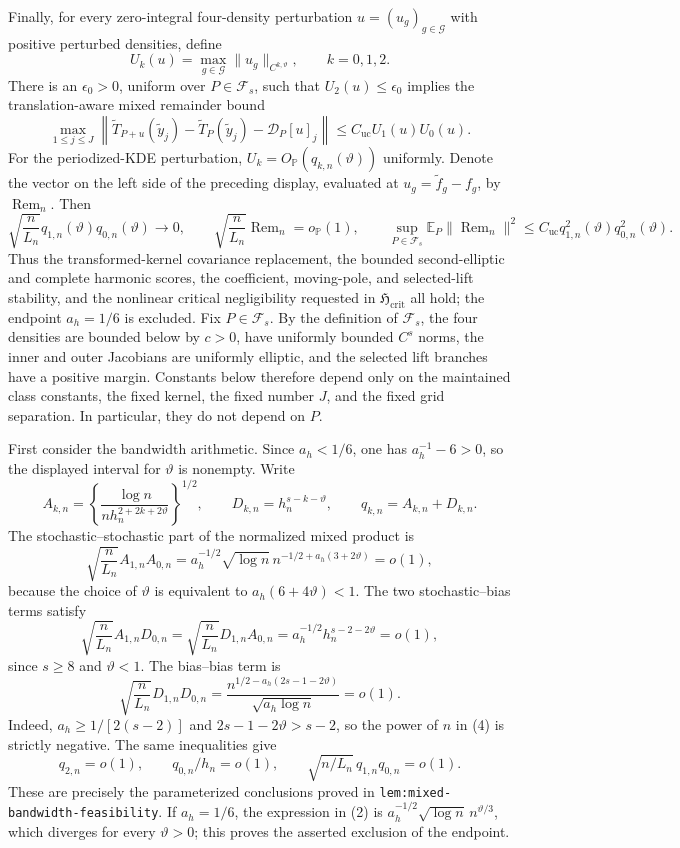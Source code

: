 Finally, for every zero-integral four-density perturbation \(u=(u_g)_{g\in\mathcal G}\) with positive perturbed densities, define
\[
 U_k(u)=\max_{g\in\mathcal G}\lVert u_g\rVert_{C^{k,\vartheta}},
 \qquad k=0,1,2.
\]
There is an \(\epsilon_0>0\), uniform over \(P\in\mathcal F_s\), such that \(U_2(u)\leq\epsilon_0\) implies the translation-aware mixed remainder bound
\[
 \max_{1\leq j\leq J}
 \left\lVert
 \widetilde T_{P+u}(\widetilde y_j)-\widetilde T_P(\widetilde y_j)
 -\mathcal D_P[u]_j
 \right\rVert
 \leq C_{\mathrm{uc}} U_1(u)U_0(u).
\]
For the periodized-KDE perturbation, \(U_k=O_{\mathbb P}(q_{k,n}(\vartheta))\) uniformly.  Denote the vector on the left side of the preceding display, evaluated at \(u_g=\widetilde f_g-f_g\), by \(\operatorname{Rem}_n\).  Then
\[
 \sqrt{\frac n{L_n}}q_{1,n}(\vartheta)q_{0,n}(\vartheta)\to0,
 \qquad
 \sqrt{\frac n{L_n}}\operatorname{Rem}_n=o_{\mathbb P}(1),
 \qquad
 \sup_{P\in\mathcal F_s}\mathbb E_P
 \lVert\operatorname{Rem}_n\rVert^2
 \leq C_{\mathrm{uc}}q_{1,n}^2(\vartheta)q_{0,n}^2(\vartheta).
\]
Thus the transformed-kernel covariance replacement, the bounded second-elliptic and complete harmonic scores, the coefficient, moving-pole, and selected-lift stability, and the nonlinear critical negligibility requested in \(\mathfrak H_{\mathrm{crit}}\) all hold; the endpoint \(a_h=1/6\) is excluded.
Fix \(P\in\mathcal F_s\).  By the definition of \(\mathcal F_s\), the four densities are bounded below by \(c>0\), have uniformly bounded \(C^s\) norms, the inner and outer Jacobians are uniformly elliptic, and the selected lift branches have a positive margin.  Constants below therefore depend only on the maintained class constants, the fixed kernel, the fixed number \(J\), and the fixed grid separation.  In particular, they do not depend on \(P\).

First consider the bandwidth arithmetic.  Since \(a_h<1/6\), one has \(a_h^{-1}-6>0\), so the displayed interval for \(\vartheta\) is nonempty.  Write
\[
 A_{k,n}=\left\{\frac{\log n}
 {n h_n^{2+2k+2\vartheta}}\right\}^{1/2},
 \qquad
 D_{k,n}=h_n^{s-k-\vartheta},
 \qquad q_{k,n}=A_{k,n}+D_{k,n}.
\tag{1}
\]
The stochastic--stochastic part of the normalized mixed product is
\[
 \sqrt{\frac n{L_n}}A_{1,n}A_{0,n}
 =a_h^{-1/2}\sqrt{\log n}\,
 n^{-1/2+a_h(3+2\vartheta)}=o(1),
\tag{2}
\]
because the choice of \(\vartheta\) is equivalent to
\(a_h(6+4\vartheta)<1\).  The two stochastic--bias terms satisfy
\[
 \sqrt{\frac n{L_n}}A_{1,n}D_{0,n}
 =\sqrt{\frac n{L_n}}D_{1,n}A_{0,n}
 =a_h^{-1/2}h_n^{s-2-2\vartheta}=o(1),
\tag{3}
\]
since \(s\geq8\) and \(\vartheta<1\).  The bias--bias term is
\[
 \sqrt{\frac n{L_n}}D_{1,n}D_{0,n}
 =\frac{n^{1/2-a_h(2s-1-2\vartheta)}}{\sqrt{a_h\log n}}=o(1).
\tag{4}
\]
Indeed, \(a_h\geq1/[2(s-2)]\) and
\(2s-1-2\vartheta>s-2\), so the power of \(n\) in (4) is strictly negative.  The same inequalities give
\[
 q_{2,n}=o(1),\qquad q_{0,n}/h_n=o(1),
 \qquad \sqrt{n/L_n}\,q_{1,n}q_{0,n}=o(1).
\tag{5}
\]
These are precisely the parameterized conclusions proved in
\texttt{lem:mixed-bandwidth-feasibility}.  If \(a_h=1/6\), the expression in (2) is
\(a_h^{-1/2}\sqrt{\log n}\,n^{\vartheta/3}\), which diverges for every \(\vartheta>0\); this proves the asserted exclusion of the endpoint.

